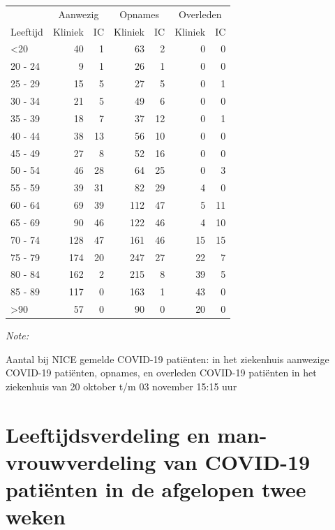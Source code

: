 \documentclass[
  english,
  man,floatsintext]{apa6}
\begin{document}
\begin{table}
\centering\begingroup\fontsize{10}{12}\selectfont

\begin{threeparttable}
\begin{tabular}{lrrrrrr}
\toprule
\multicolumn{1}{c}{ } & \multicolumn{2}{c}{Aanwezig} & \multicolumn{2}{c}{Opnames} & \multicolumn{2}{c}{Overleden} \\
\cmidrule(l{3pt}r{3pt}){2-3} \cmidrule(l{3pt}r{3pt}){4-5} \cmidrule(l{3pt}r{3pt}){6-7}
Leeftijd & Kliniek & IC & Kliniek & IC & Kliniek & IC\\
\midrule
<20 & 40 & 1 & 63 & 2 & 0 & 0\\
20 - 24 & 9 & 1 & 26 & 1 & 0 & 0\\
25 - 29 & 15 & 5 & 27 & 5 & 0 & 1\\
30 - 34 & 21 & 5 & 49 & 6 & 0 & 0\\
35 - 39 & 18 & 7 & 37 & 12 & 0 & 1\\
40 - 44 & 38 & 13 & 56 & 10 & 0 & 0\\
45 - 49 & 27 & 8 & 52 & 16 & 0 & 0\\
50 - 54 & 46 & 28 & 64 & 25 & 0 & 3\\
55 - 59 & 39 & 31 & 82 & 29 & 4 & 0\\
60 - 64 & 69 & 39 & 112 & 47 & 5 & 11\\
65 - 69 & 90 & 46 & 122 & 46 & 4 & 10\\
70 - 74 & 128 & 47 & 161 & 46 & 15 & 15\\
75 - 79 & 174 & 20 & 247 & 27 & 22 & 7\\
80 - 84 & 162 & 2 & 215 & 8 & 39 & 5\\
85 - 89 & 117 & 0 & 163 & 1 & 43 & 0\\
>90 & 57 & 0 & 90 & 0 & 20 & 0\\
\bottomrule
\end{tabular}
\begin{tablenotes}
\item \textit{Note: } 
\item Aantal bij NICE gemelde COVID-19 patiënten: in het ziekenhuis aanwezige COVID-19 patiënten, opnames, en overleden COVID-19 patiënten in het ziekenhuis van 20 oktober t/m 03 november 15:15 uur
\end{tablenotes}
\end{threeparttable}
\endgroup{}
\end{table}

\newpage

\hypertarget{leeftijdsverdeling-en-man-vrouwverdeling-van-covid-19-patiuxebnten-in-de-afgelopen-twee-weken}{%
\section{Leeftijdsverdeling en man-vrouwverdeling van COVID-19 patiënten in de afgelopen twee weken}\label{leeftijdsverdeling-en-man-vrouwverdeling-van-covid-19-patiuxebnten-in-de-afgelopen-twee-weken}}
\end{document}
